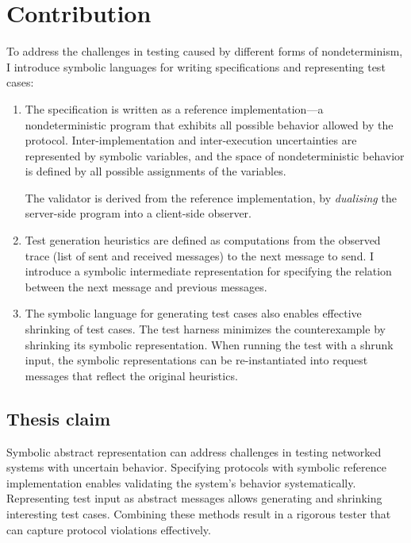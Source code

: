 \section{Contribution}
\label{sec:contribution}
To address the challenges in testing caused by different forms of
nondeterminism, I introduce symbolic languages for writing specifications and
representing test cases:

\begin{enumerate}
\item The specification is written as a reference implementation---a
nondeterministic program that exhibits all possible behavior allowed by
the protocol.  Inter-implementation and inter-execution uncertainties are
represented by symbolic variables, and the space of nondeterministic behavior is
defined by all possible assignments of the variables.

The validator is derived from the reference implementation, by {\em
  dualising} the server-side program into a client-side observer.

\item Test generation heuristics are defined as computations from the observed
trace (list of sent and received messages) to the next message to send.  I
introduce a symbolic intermediate representation for specifying the relation
between the next message and previous messages.

\item The symbolic language for generating test cases also enables effective
shrinking of test cases.  The test harness minimizes the counterexample by
shrinking its symbolic representation.  When running the test with a shrunk
input, the symbolic representations can be re-instantiated into request messages
that reflect the original heuristics.
\end{enumerate}

\subsection*{Thesis claim}
Symbolic abstract representation can address challenges in testing networked
systems with uncertain behavior.  Specifying protocols with symbolic reference
implementation enables validating the system's behavior systematically.
Representing test input as abstract messages allows generating and shrinking
interesting test cases.  Combining these methods result in a rigorous tester
that can capture protocol violations effectively.

